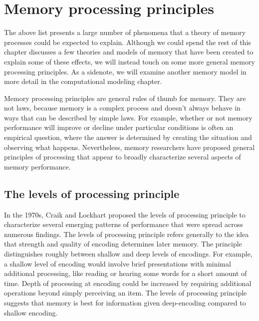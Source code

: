 \documentclass[
  oneside,
  12pt]{crumpbook}
\begin{document}
\hypertarget{memory-processing-principles}{%
\section{Memory processing principles}\label{memory-processing-principles}}

The above list presents a large number of phenomena that a theory of memory processes could be expected to explain. Although we could spend the rest of this chapter discusses a few theories and models of memory that have been created to explain some of these effects, we will instead touch on some more general memory processing principles. As a sidenote, we will examine another memory model in more detail in the computational modeling chapter.

Memory processing principles are general rules of thumb for memory. They are not laws, because memory is a complex process and doesn't always behave in ways that can be described by simple laws. For example, whether or not memory performance will improve or decline under particular conditions is often an empirical question, where the answer is determined by creating the situation and observing what happens. Nevertheless, memory researchers have proposed general principles of processing that appear to broadly characterize several aspects of memory performance.

\hypertarget{the-levels-of-processing-principle}{%
\subsection{The levels of processing principle}\label{the-levels-of-processing-principle}}

In the 1970s, Craik and Lockhart proposed the levels of processing principle to characterize several emerging patterns of performance that were spread across numerous findings. The levels of processing principle refers generally to the idea that strength and quality of encoding determines later memory. The principle distinguishes roughly between shallow and deep levels of encodings. For example, a shallow level of encoding would involve brief presentations with minimal additional processing, like reading or hearing some words for a short amount of time. Depth of processing at encoding could be increased by requiring additional operations beyond simply perceiving an item. The levels of processing principle suggests that memory is best for information given deep-encoding compared to shallow encoding.
\end{document}
